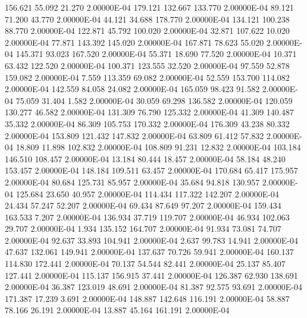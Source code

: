    156.621    55.092    21.270  2.00000E-04
   179.121   132.667   133.770  2.00000E-04
    89.121    71.200    43.770  2.00000E-04
    44.121    34.688   178.770  2.00000E-04
   134.121   100.238    88.770  2.00000E-04
   122.871    45.792   100.020  2.00000E-04
    32.871   107.622    10.020  2.00000E-04
    77.871   143.392   145.020  2.00000E-04
   167.871    78.623    55.020  2.00000E-04
   145.371    93.023   167.520  2.00000E-04
    55.371    18.690    77.520  2.00000E-04
    10.371    63.432   122.520  2.00000E-04
   100.371   123.555    32.520  2.00000E-04
    97.559    52.878   159.082  2.00000E-04
     7.559   113.359    69.082  2.00000E-04
    52.559   153.700   114.082  2.00000E-04
   142.559    84.058    24.082  2.00000E-04
   165.059    98.423    91.582  2.00000E-04
    75.059    31.404     1.582  2.00000E-04
    30.059    69.298   136.582  2.00000E-04
   120.059   130.277    46.582  2.00000E-04
   131.309    76.790   125.332  2.00000E-04
    41.309   140.487    35.332  2.00000E-04
    86.309   105.753   170.332  2.00000E-04
   176.309    43.238    80.332  2.00000E-04
   153.809   121.432   147.832  2.00000E-04
    63.809    61.412    57.832  2.00000E-04
    18.809    11.898   102.832  2.00000E-04
   108.809    91.231    12.832  2.00000E-04
   103.184   146.510   108.457  2.00000E-04
    13.184    80.444    18.457  2.00000E-04
    58.184    48.240   153.457  2.00000E-04
   148.184   109.511    63.457  2.00000E-04
   170.684    65.417   175.957  2.00000E-04
    80.684   125.731    85.957  2.00000E-04
    35.684    94.818   130.957  2.00000E-04
   125.684    23.650    40.957  2.00000E-04
   114.434   117.322   142.207  2.00000E-04
    24.434    57.247    52.207  2.00000E-04
    69.434    87.649    97.207  2.00000E-04
   159.434   163.533     7.207  2.00000E-04
   136.934    37.719   119.707  2.00000E-04
    46.934   102.063    29.707  2.00000E-04
     1.934   135.152   164.707  2.00000E-04
    91.934    73.081    74.707  2.00000E-04
    92.637    33.893   104.941  2.00000E-04
     2.637    99.783    14.941  2.00000E-04
    47.637   132.061   149.941  2.00000E-04
   137.637    70.726    59.941  2.00000E-04
   160.137   114.830   172.441  2.00000E-04
    70.137    54.544    82.441  2.00000E-04
    25.137    85.407   127.441  2.00000E-04
   115.137   156.915    37.441  2.00000E-04
   126.387    62.930   138.691  2.00000E-04
    36.387   123.019    48.691  2.00000E-04
    81.387    92.575    93.691  2.00000E-04
   171.387    17.239     3.691  2.00000E-04
   148.887   142.648   116.191  2.00000E-04
    58.887    78.166    26.191  2.00000E-04
    13.887    45.164   161.191  2.00000E-04
